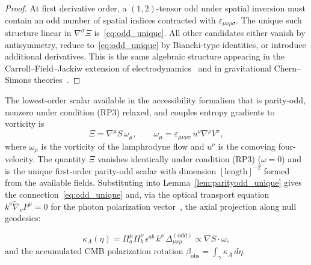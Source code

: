 \documentclass[12pt,a4paper]{article}
\theoremstyle{plain}
\theoremstyle{definition}
\theoremstyle{remark}
\newcommand{\kA}{\kappa_A}
\begin{document}
\begin{proof}
At first derivative order, a $(1,2)$-tensor odd under spatial inversion must
contain an odd number of spatial indices contracted with $\varepsilon_{\mu\nu\rho\sigma}$.
The unique such structure linear in $\nabla^\sigma\Xi$ is~\eqref{eq:odd_unique}.
All other candidates either vanish by antisymmetry, reduce to~\eqref{eq:odd_unique}
by Bianchi-type identities, or introduce additional derivatives. This is the same
algebraic structure appearing in the Carroll--Field--Jackiw
extension of electrodynamics~\cite{Carroll1990} and in gravitational Chern--Simons
theories~\cite{Wald1984}.
\end{proof}

The lowest-order scalar available in the accessibility formalism that is parity-odd,
nonzero under condition (RP3) relaxed, and couples entropy gradients to vorticity is
\begin{equation}
  \Xi = \nabla^\mu S\,\omega_\mu,
  \qquad
  \omega_\mu = \varepsilon_{\mu\nu\rho\sigma}\,u^\nu\nabla^\rho V^\sigma,
  \label{eq:Xi_def}
\end{equation}
where $\omega_\mu$ is the vorticity of the lamphrodyne flow and $u^\nu$ is the
comoving four-velocity. The quantity $\Xi$ vanishes identically under condition
(RP3) ($\omega = 0$) and is the unique first-order parity-odd scalar with
dimension $[\text{length}]^{-2}$ formed from the available fields. Substituting
into Lemma~\ref{lem:parityodd_unique} gives the connection~\eqref{eq:odd_unique}
and, via the optical transport equation $k^\nu\tilde\nabla_\nu P^\mu = 0$ for the
photon polarization vector~\cite{Wald1984}, the axial projection along null geodesics:

\begin{equation}
  \kA(\eta) = \Pi^\mu_a\Pi^\nu_b\,\epsilon^{ab}\,k^\rho\,\Delta^{(\mathrm{odd})}_{\mu\nu\rho}
  \propto \nabla S\cdot\omega,
  \label{eq:kA_formula}
\end{equation}
and the accumulated CMB polarization rotation $\beta_{\mathrm{obs}} = \int_\gamma\kA\,d\eta$.
\end{document}
